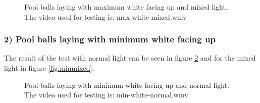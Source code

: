 \begin{figure}[H]
  \centering
  \quad
  \quad
   \caption{Pool balls laying with maximum white facing up and mixed light. The video used for testing is: max-white-mixed.wmv}
  \label{fig:maxmixed}
\end{figure}


\subsubsection{2) Pool balls laying with minimum white facing up}
The result of the test with normal light can be seen in figure \ref{fig:minnormal} and for the mixed light in figure \ref{fig:minmixed}.

\begin{figure}[H]
  \centering
  \quad
	\quad
   \caption{Pool balls laying with minimum white facing up and normal light. The video used for testing is: min-white-normal.wmv}
  \label{fig:minnormal}
\end{figure}

